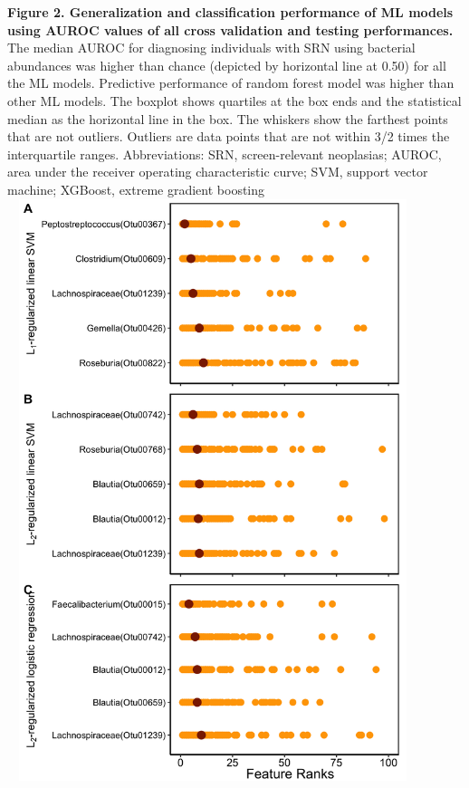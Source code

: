 \documentclass[11pt,]{article}
\begin{document}
\textbf{Figure 2. Generalization and classification performance of ML
models using AUROC values of all cross validation and testing
performances. } The median AUROC for diagnosing individuals with SRN
using bacterial abundances was higher than chance (depicted by
horizontal line at 0.50) for all the ML models. Predictive performance
of random forest model was higher than other ML models. The boxplot
shows quartiles at the box ends and the statistical median as the
horizontal line in the box. The whiskers show the farthest points that
are not outliers. Outliers are data points that are not within 3/2 times
the interquartile ranges. Abbreviations: SRN, screen-relevant
neoplasias; AUROC, area under the receiver operating characteristic
curve; SVM, support vector machine; XGBoost, extreme gradient boosting
\newpage
\includegraphics[height=17cm, width=12cm]{Figure_3.png}
\end{document}

